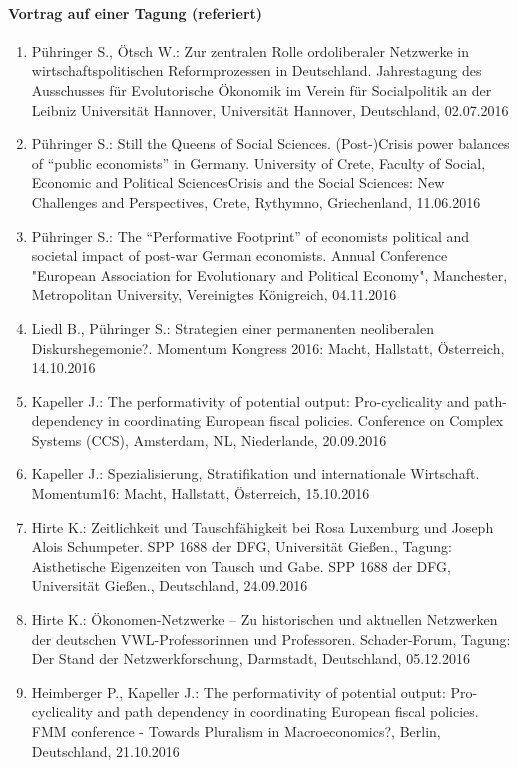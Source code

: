 \paragraph{Vortrag auf einer Tagung (referiert)}
\begin{enumerate}
	\item Pühringer S., Ötsch W.: Zur zentralen Rolle ordoliberaler Netzwerke in wirtschaftspolitischen Reformprozessen in Deutschland. Jahrestagung des Ausschusses für Evolutorische Ökonomik im Verein für Socialpolitik an der Leibniz Universität Hannover, Universität Hannover, Deutschland, 02.07.2016
	\item Pühringer S.: Still the Queens of Social Sciences. (Post-)Crisis power balances  of “public economists” in Germany. University of Crete, Faculty of Social, Economic and Political SciencesCrisis and the Social Sciences: New Challenges and Perspectives, Crete, Rythymno, Griechenland, 11.06.2016
	\item Pühringer S.: The “Performative Footprint” of economists political and societal impact of post-war German economists. Annual Conference "European Association for Evolutionary and Political Economy", Manchester, Metropolitan University, Vereinigtes Königreich, 04.11.2016
	\item Liedl B., Pühringer S.: Strategien einer permanenten neoliberalen Diskurshegemonie?. Momentum Kongress 2016: Macht, Hallstatt, Österreich, 14.10.2016
	\item Kapeller J.: The performativity of potential output: Pro-cyclicality and path-dependency in coordinating European fiscal policies. Conference on Complex Systems (CCS), Amsterdam, NL, Niederlande, 20.09.2016
	\item Kapeller J.: Spezialisierung, Stratifikation und internationale Wirtschaft. Momentum16: Macht, Hallstatt, Österreich, 15.10.2016
	\item Hirte K.: Zeitlichkeit und Tauschfähigkeit bei Rosa Luxemburg und Joseph Alois Schumpeter. SPP 1688 der DFG, Universität Gießen., Tagung: Aisthetische Eigenzeiten von Tausch und Gabe. SPP 1688 der DFG, Universität Gießen., Deutschland, 24.09.2016
	\item Hirte K.: Ökonomen-Netzwerke – Zu historischen und aktuellen Netzwerken der deutschen VWL-Professorinnen und Professoren. Schader-Forum, Tagung: Der Stand der Netzwerkforschung, Darmstadt, Deutschland, 05.12.2016
	\item Heimberger P., Kapeller J.: The performativity of potential output: Pro-cyclicality and path dependency in coordinating European fiscal policies. FMM conference - Towards Pluralism in Macroeconomics?, Berlin, Deutschland, 21.10.2016

\end{enumerate}
